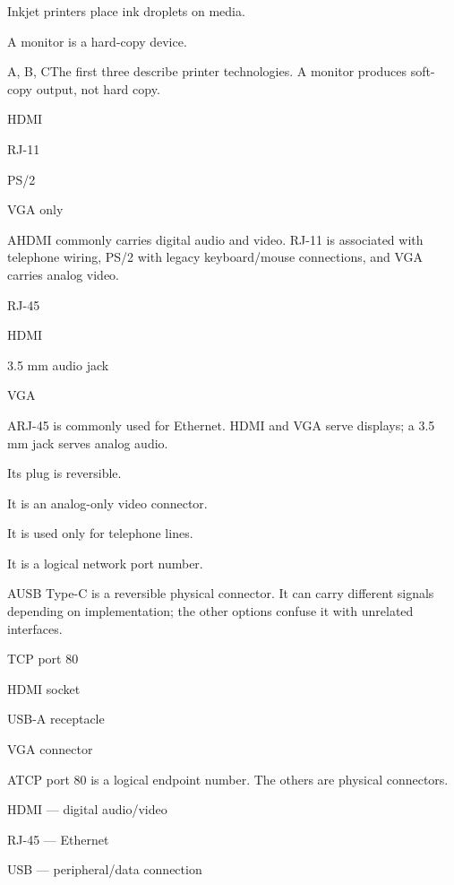 \begin{enumerate}[label=\textbf{Q\arabic*.}, leftmargin=*]
{   \item Inkjet printers place ink droplets on media.
   \item A monitor is a hard-copy device.}
  {A, B, C}{The first three describe printer technologies. A monitor produces soft-copy output, not hard copy.}
\fi
\ifnum{}
  {\item HDMI
   \item RJ-11
   \item PS/2
   \item VGA only}
  {A}{HDMI commonly carries digital audio and video. RJ-11 is associated with telephone wiring, PS/2 with legacy keyboard/mouse connections, and VGA carries analog video.}
  {\item RJ-45
   \item HDMI
   \item 3.5 mm audio jack
   \item VGA}
  {A}{RJ-45 is commonly used for Ethernet. HDMI and VGA serve displays; a 3.5 mm jack serves analog audio.}
  {\item Its plug is reversible.
   \item It is an analog-only video connector.
   \item It is used only for telephone lines.
   \item It is a logical network port number.}
  {A}{USB Type-C is a reversible physical connector. It can carry different signals depending on implementation; the other options confuse it with unrelated interfaces.}
  {\item TCP port 80
   \item HDMI socket
   \item USB-A receptacle
   \item VGA connector}
  {A}{TCP port 80 is a logical endpoint number. The others are physical connectors.}
  {\item HDMI --- digital audio/video
   \item RJ-45 --- Ethernet
   \item USB --- peripheral/data connection
}
\end{enumerate}
